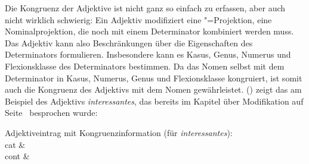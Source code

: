 \noindent
Die Kongruenz der Adjektive ist nicht ganz so einfach zu erfassen, aber auch nicht wirklich schwierig:
Ein Adjektiv modifiziert eine \nbar"=Projektion, \dash eine Nominalprojektion, die noch mit einem Determinator
kombiniert werden muss. Das Adjektiv kann also Beschränkungen über die Eigenschaften des Determinators
formulieren. Insbesondere kann es Kasus, Genus, Numerus und Flexionsklasse des Determinators bestimmen.
Da das Nomen selbst mit dem Determinator in Kasus, Numerus, Genus und Flexionsklasse kongruiert, ist somit
auch die Kongruenz des Adjektivs mit dem Nomen gewährleistet. () zeigt das am Beispiel
des Adjektivs \emph{interessantes}, das bereits im Kapitel über Modifikation auf Seite~\pageref{le-kleinen-sem}
besprochen wurde:

\eas
\label{le-interessantes-agr}%
Adjektiveintrag mit Kongruenzinformation (\localw für \emph{interessantes}):\\
\ms
 { cat &  \\
   cont &  \\
}
\zs

